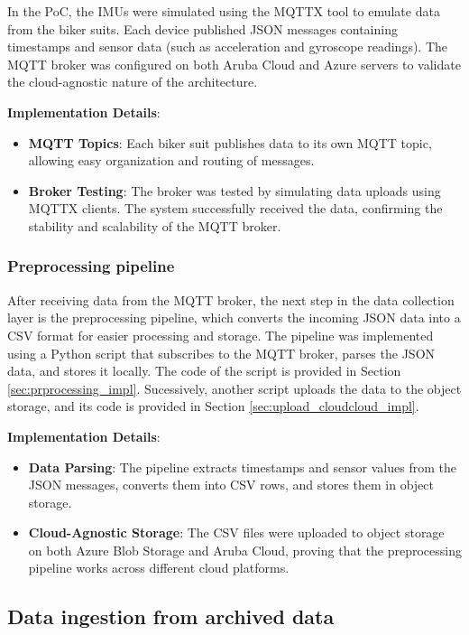 In the PoC, the IMUs were simulated using the MQTTX tool to emulate data from the biker suits. Each device published JSON messages containing timestamps and sensor data (such as acceleration and gyroscope readings). The MQTT broker was configured on both Aruba Cloud and Azure servers to validate the cloud-agnostic nature of the architecture.

\textbf{Implementation Details}:
\begin{itemize}
    \item \textbf{MQTT Topics}: Each biker suit publishes data to its own MQTT topic, allowing easy organization and routing of messages.
    \item \textbf{Broker Testing}: The broker was tested by simulating data uploads using MQTTX clients. The system successfully received the data, confirming the stability and scalability of the MQTT broker.
\end{itemize}

\subsubsection{Preprocessing pipeline}
After receiving data from the MQTT broker, the next step in the data collection layer is the preprocessing pipeline, which converts the incoming JSON data into a CSV format for easier processing and storage. The pipeline was implemented using a Python script that subscribes to the MQTT broker, parses the JSON data, and stores it locally. The code of the script is provided in Section \ref{sec:prprocessing_impl}. Sucessively, another script uploads the data to the object storage, and its code is provided in Section \ref{sec:upload_cloudcloud_impl}.

\textbf{Implementation Details}:
\begin{itemize}
    \item \textbf{Data Parsing}: The pipeline extracts timestamps and sensor values from the JSON messages, converts them into CSV rows, and stores them in object storage.
    \item \textbf{Cloud-Agnostic Storage}: The CSV files were uploaded to object storage on both Azure Blob Storage and Aruba Cloud, proving that the preprocessing pipeline works across different cloud platforms.
\end{itemize}

\subsection{Data ingestion from archived data}
\label{sec:archived_data_ingestion}

